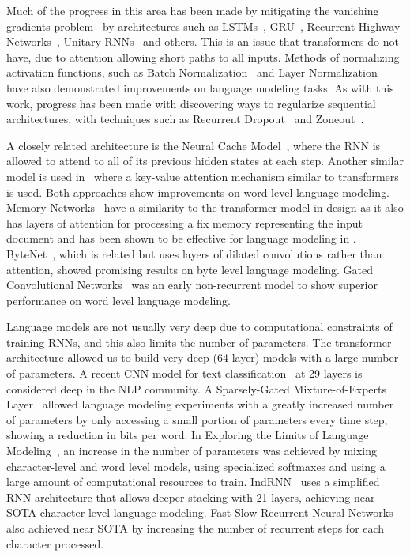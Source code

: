 Much of the progress in this area has been made by mitigating the vanishing gradients problem~\cite{hochreiter2001gradient} by architectures such as LSTMs~\cite{LSTM}, GRU~\cite{DBLP:journals/corr/ChoMGBSB14}, Recurrent Highway Networks~\cite{DBLP:journals/corr/ZillySKS16}, Unitary RNNs~\cite{DBLP:journals/corr/ArjovskySB15} and others. This is an issue that transformers do not have, due to attention allowing short paths to all inputs. Methods of normalizing activation functions, such as Batch Normalization~\cite{DBLP:journals/corr/IoffeS15,DBLP:journals/corr/abs-1708-02182} and Layer Normalization~\cite{2016arXiv160706450L} have also demonstrated improvements on language modeling tasks. As with this work, progress has been made with discovering ways to regularize sequential architectures, with techniques such as Recurrent Dropout~\cite{DBLP:journals/corr/ZarembaSV14,2015arXiv151205287G} and Zoneout~\cite{krueger2016zoneout,rocki2016surprisal}.

A closely related architecture is the Neural Cache Model~\cite{DBLP:journals/corr/GraveJU16}, where the RNN is allowed to attend to all of its previous hidden states at each step. Another similar model is used in~\cite{DBLP:journals/corr/DanilukRWR17} where a key-value attention mechanism similar to transformers is used. Both approaches show improvements on word level language modeling. Memory Networks~\cite{DBLP:journals/corr/WestonCB14} have a similarity to the transformer model in design as it also has layers of attention for processing a fix memory representing the input document and has been shown to be effective for language modeling in \cite{sukhbaatar2015end}. ByteNet~\cite{kalchbrenner2016neural}, which is related but uses layers of dilated convolutions rather than attention, showed promising results on byte level language modeling. Gated Convolutional Networks~\cite{DBLP:journals/corr/DauphinFAG16} was an early non-recurrent model to show superior performance on word level language modeling.

Language models are not usually very deep due to computational constraints of training RNNs, and this also limits the number of parameters. The transformer architecture allowed us to build very deep (64 layer) models with a large number of parameters. A recent CNN model for text classification~\cite{DBLP:journals/corr/ConneauSBL16} at 29 layers is considered deep in the NLP community. A Sparsely-Gated Mixture-of-Experts Layer~\cite{DBLP:journals/corr/ShazeerMMDLHD17} allowed language modeling experiments with a greatly increased number of parameters by only accessing a small portion of parameters every time step, showing a reduction in bits per word. In Exploring the Limits of Language Modeling~\cite{DBLP:journals/corr/JozefowiczVSSW16}, an increase in the number of parameters was achieved by mixing character-level and word level models, using specialized softmaxes and using a large amount of computational resources to train. IndRNN~\cite{DBLP:journals/corr/abs-1803-04831} uses a simplified RNN architecture that allows deeper stacking with 21-layers, achieving near SOTA character-level language modeling. Fast-Slow Recurrent Neural Networks~\cite{mujika2017fast} also achieved near SOTA by increasing the number of recurrent steps for each character processed.

